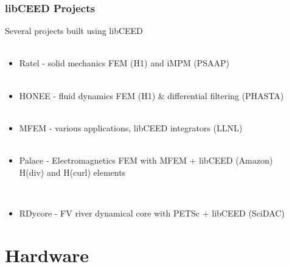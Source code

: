 \documentclass{beamer}
\begin{document}

\begin{frame}
\begin{center}
\frametitle{libCEED Projects}

Several projects built using libCEED\\

~\\

\begin{itemize}

\item Ratel - solid mechanics FEM (H1) and iMPM (PSAAP)\\

~\\

\item HONEE - fluid dynamics FEM (H1) \& differential filtering (PHASTA)\\

~\\

\item MFEM - various applications, libCEED integrators (LLNL)\\

~\\

\item Palace - Electromagnetics FEM with MFEM + libCEED (Amazon)\\
\hspace{13mm} H(div) and H(curl) elements

~\\

\item RDycore - FV river dynamical core with PETSc + libCEED (SciDAC)\\

\end{itemize}

\end{center}
\end{frame}

\section{Hardware}
\end{document}
